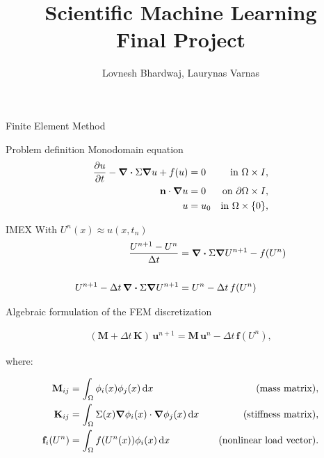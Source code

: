 \documentclass[14pt,aspectratio=169]{beamer}
\title{Scientific Machine Learning \\ Final Project}
\author{Lovnesh Bhardwaj, Laurynas Varnas}
\date{}
\begin{document}
\begin{frame}
	\titlepage
\end{frame}

\begin{frame}[plain]
	\centering
	Finite Element Method
\end{frame}

\begin{frame}{Problem definition}
	Monodomain equation
	\begin{align*}
		\pdv{u}{t} - \divergence \Sigma \grad u + f(u) & = 0   & \text{in } \Omega \times I,          \\
		\mathbf{n} \cdot \grad u                       & = 0   & \text{on } \partial \Omega \times I, \\
		u                                              & = u_0 & \text{in } \Omega \times \{0\},
	\end{align*}
\end{frame}

\begin{frame}{IMEX}
	With $U^n(x) \approx u(x, t_n)$
	\begin{align*}
		\frac{U^{n+1} - U^n}{\Delta t}                        & = \divergence \Sigma \grad U^{n+1} - f(U^n) \\
		\\
		U^{n+1} - \Delta t\, \divergence \Sigma \grad U^{n+1} & = U^n - \Delta t\, f(U^n)
	\end{align*}
\end{frame}

\begin{frame}{Algebraic formulation of the FEM discretization}

	\begin{align*}
		(\mathbf M + \Delta t\, \mathbf K)\, \mathbf u^{n+1} = \mathbf M\, \mathbf u^n - \Delta t\, \mathbf f(U^n),
	\end{align*}

	where:

	\begin{align*}
		\mathbf M_{ij}   & = \int_\Omega \phi_i(x) \phi_j(x)\,\diffd x \quad                             & \text{(mass matrix)},           \\
		\mathbf K_{ij}   & = \int_\Omega \Sigma(x) \grad \phi_i(x) \cdot \grad \phi_j(x)\,\diffd x \quad & \text{(stiffness matrix)},      \\
		\mathbf f_i(U^n) & = \int_\Omega f(U^n(x)) \phi_i(x)\,\diffd x \quad                             & \text{(nonlinear load vector)}.
	\end{align*}
\end{frame}
\end{document}
